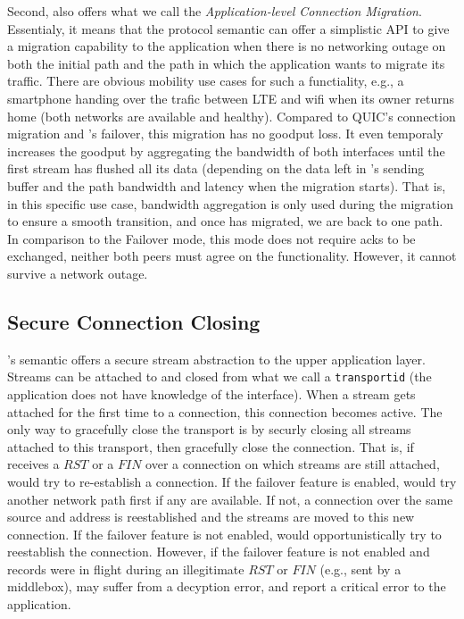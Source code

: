 Second, \tcpls also offers what we call the \textit{Application-level Connection
  Migration}. Essentialy, it means that the \tcpls protocol semantic can offer a
simplistic API to give a migration capability to the application when there is
no networking outage on both the initial path and the path in which the
application wants to migrate its traffic. There are obvious mobility use cases
for such a functiality, e.g., a smartphone handing over the trafic between LTE
and wifi when its owner returns home (both networks are available and healthy).
Compared to QUIC's connection migration and \tcpls's failover, this migration
has no goodput loss. It even temporaly increases the goodput by aggregating the
bandwidth of both interfaces until the first stream has flushed all its data
(depending on the data left in \tcp's sending buffer and the path bandwidth and
latency when the migration starts).  That is, in this specific use case,
bandwidth aggregation is only used during the migration to ensure a smooth
transition, and once \tcpls has migrated, we are back to one path. In comparison
to the Failover mode, this mode does not require acks to be exchanged, neither
both peers must agree on the functionality. However, it cannot survive a network
outage.

\subsection{Secure Connection Closing}

\tcpls's semantic offers a secure stream abstraction to the upper application
layer.
Streams can be attached to and closed from what we call a \texttt{transportid}
(the application does not have knowledge of the \tcp interface). When a stream
gets attached for the first time to a \tcp connection, this connection becomes
active. The only way to gracefully close the transport is by securly closing all
streams attached to this transport, then \tcpls gracefully close the \tcp
connection. That is, if \tcpls receives a $RST$ or a $FIN$ over a \tcp
connection on which streams are still attached, \tcpls would try to re-establish
a \tcp connection. If the failover feature is enabled, \tcpls would try another
network path first if any are available. If not, a connection over the same
source and address is reestablished and the streams are moved to this new \tcp
connection. If the failover feature is not enabled, \tcpls would opportunistically try to
reestablish the connection. However, if the failover feature is not enabled and
records were in flight during an illegitimate $RST$ or $FIN$ (e.g., sent by a
middlebox), \tcpls may suffer from a decyption error, and report a critical
error to the application.



